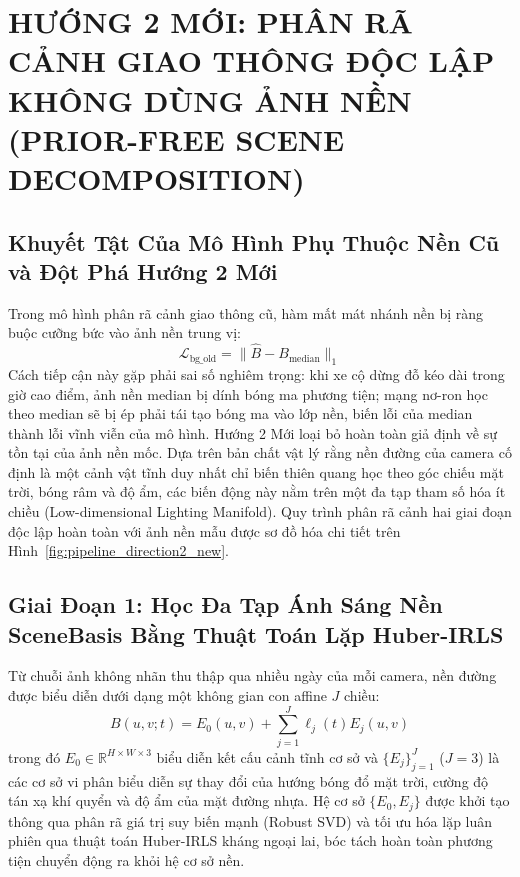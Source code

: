 \documentclass[11pt,a4paper]{article}
\begin{document}
\section{HƯỚNG 2 MỚI: PHÂN RÃ CẢNH GIAO THÔNG ĐỘC LẬP KHÔNG DÙNG ẢNH NỀN (PRIOR-FREE SCENE DECOMPOSITION)}

\subsection{Khuyết Tật Của Mô Hình Phụ Thuộc Nền Cũ và Đột Phá Hướng 2 Mới}
Trong mô hình phân rã cảnh giao thông cũ, hàm mất mát nhánh nền bị ràng buộc cưỡng bức vào ảnh nền trung vị:
\begin{equation}
    \mathcal{L}_{\text{bg\_old}} = \|\hat{B} - B_{\text{median}}\|_1
\end{equation}
Cách tiếp cận này gặp phải sai số nghiêm trọng: khi xe cộ dừng đỗ kéo dài trong giờ cao điểm, ảnh nền median bị dính bóng ma phương tiện; mạng nơ-ron học theo median sẽ bị ép phải tái tạo bóng ma vào lớp nền, biến lỗi của median thành lỗi vĩnh viễn của mô hình.
Hướng 2 Mới loại bỏ hoàn toàn giả định về sự tồn tại của ảnh nền mốc. Dựa trên bản chất vật lý rằng nền đường của camera cố định là một cảnh vật tĩnh duy nhất chỉ biến thiên quang học theo góc chiếu mặt trời, bóng râm và độ ẩm, các biến động này nằm trên một đa tạp tham số hóa ít chiều (Low-dimensional Lighting Manifold). Quy trình phân rã cảnh hai giai đoạn độc lập hoàn toàn với ảnh nền mẫu được sơ đồ hóa chi tiết trên Hình~\ref{fig:pipeline_direction2_new}.

\subsection{Giai Đoạn 1: Học Đa Tạp Ánh Sáng Nền SceneBasis Bằng Thuật Toán Lặp Huber-IRLS}
Từ chuỗi ảnh không nhãn thu thập qua nhiều ngày của mỗi camera, nền đường được biểu diễn dưới dạng một không gian con affine $J$ chiều:
\begin{equation}
    B(u, v; t) = E_0(u, v) + \sum_{j=1}^J \ell_j(t) E_j(u, v)
\end{equation}
trong đó $E_0 \in \mathbb{R}^{H \times W \times 3}$ biểu diễn kết cấu cảnh tĩnh cơ sở và $\{E_j\}_{j=1}^J$ ($J = 3$) là các cơ sở vi phân biểu diễn sự thay đổi của hướng bóng đổ mặt trời, cường độ tán xạ khí quyển và độ ẩm của mặt đường nhựa.
Hệ cơ sở $\{E_0, E_j\}$ được khởi tạo thông qua phân rã giá trị suy biến mạnh (Robust SVD) và tối ưu hóa lặp luân phiên qua thuật toán Huber-IRLS kháng ngoại lai, bóc tách hoàn toàn phương tiện chuyển động ra khỏi hệ cơ sở nền.
\end{document}
